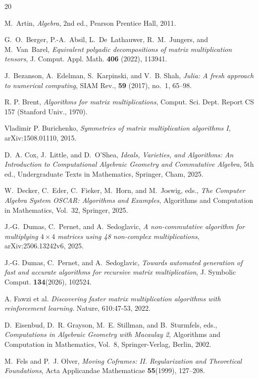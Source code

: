 \documentclass[reqno]{amsart}
\theoremstyle{definition}
\numberwithin{equation}{section}
\theoremstyle{remark}
\begin{document}

\begin{thebibliography}{20}

M.~Artin,
\emph{Algebra}, 2nd ed., Pearson Prentice Hall, 2011.


G.~O.~Berger, P.-A.~Absil, L.~De~Lathauwer, R.~M.~Jungers, and M.~Van~Barel,
\emph{Equivalent polyadic decompositions of matrix multiplication tensors},
J. Comput. Appl. Math. \textbf{406} (2022), 113941.

J.~Bezanson, A.~Edelman, S.~Karpinski, and V.~B. Shah,
\emph{Julia: A fresh approach to numerical computing},
SIAM Rev., \textbf{59} (2017), no.~1, 65--98.

R. P. Brent, \emph{Algorithms for matrix multiplications}, Comput. Sci. Dept. Report CS 157 (Stanford Univ., 1970).

Vladimir P. Burichenko, \textit{Symmetries of matrix multiplication algorithms I},  arXiv:1508.01110, 2015.

D.~A. Cox, J.~Little, and D.~O'Shea,
\textit{Ideals, Varieties, and Algorithms:
An Introduction to Computational Algebraic Geometry and Commutative Algebra}, 5th ed., Undergraduate Texts in Mathematics, Springer, Cham, 2025.

W.~Decker, C.~Eder, C.~Fieker, M.~Horn, and M.~Joswig, eds.,
\emph{The Computer Algebra System OSCAR: Algorithms and Examples},
Algorithms and Computation in Mathematics, Vol.~32,
Springer, 2025.

J.-G.~Dumas, C.~Pernet, and A.~Sedoglavic,
\emph{A non-commutative algorithm for multiplying $4\times 4$ matrices using 48 non-complex multiplications},
arXiv:2506.13242v6, 2025.

J.-G. Dumas, C.~Pernet, and A.~Sedoglavic,
\emph{Towards automated generation of fast and accurate algorithms for recursive matrix multiplication},
J. Symbolic Comput. \textbf{134}(2026), 102524.

A. Fawzi et al. \textit{Discovering faster matrix multiplication algorithms with reinforcement learning.} Nature, 610:47-53, 2022.

D.~Eisenbud, D.~R. Grayson, M.~E. Stillman, and B.~Sturmfels, eds.,
\emph{Computations in Algebraic Geometry with Macaulay 2},
Algorithms and Computation in Mathematics, Vol.~8, Springer-Verlag, Berlin, 2002.


M.~Fels and P.~J. Olver,
\emph{Moving Coframes: II. Regularization and Theoretical Foundations},
Acta Applicandae Mathematicae \textbf{55}(1999), 127--208.


\end{thebibliography}
\end{document}
